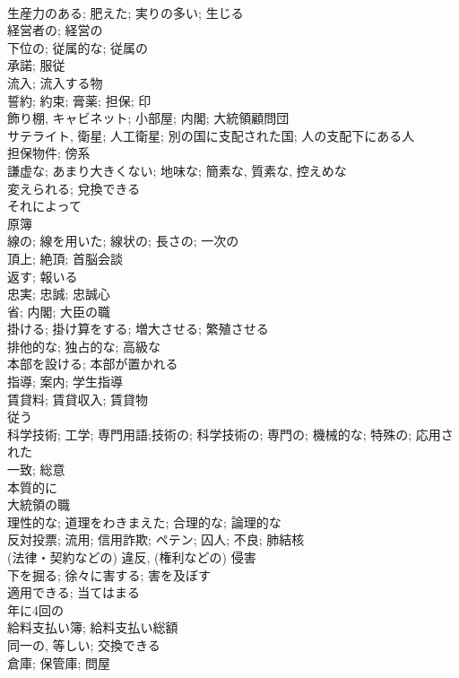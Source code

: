 \documentclass[8pt]{extreport}
\begin{document}
\begin{CJK}{UTF8}{min}
\\	生産力のある; 肥えた; 実りの多い; 生じる	
\\	経営者の; 経営の
\\	下位の; 従属的な; 従属の	
\\	承諾; 服従	
\\	流入; 流入する物	
\\	誓約; 約束; 膏薬; 担保; 印	
\\	飾り棚, キャビネット; 小部屋; 内閣; 大統領顧問団	
\\	サテライト, 衛星; 人工衛星; 別の国に支配された国; 人の支配下にある人	
\\	担保物件; 傍系	
\\	謙虚な; あまり大きくない; 地味な; 簡素な, 質素な, 控えめな	
\\	変えられる; 兌換できる	
\\	それによって	
\\	原簿	
\\	線の; 線を用いた; 線状の; 長さの; 一次の	
\\	頂上; 絶頂; 首脳会談	
\\	返す; 報いる	
\\	忠実; 忠誠; 忠誠心	
\\	省; 内閣; 大臣の職	
\\	掛ける; 掛け算をする; 増大させる; 繁殖させる	
\\	排他的な; 独占的な; 高級な	
\\	本部を設ける; 本部が置かれる	
\\	指導; 案内; 学生指導	
\\	賃貸料; 賃貸収入; 賃貸物	
\\	従う	
\\	科学技術; 工学; 専門用語;技術の; 科学技術の; 専門の; 機械的な; 特殊の; 応用された	
\\	一致; 総意	
\\	本質的に	
\\	大統領の職	
\\	理性的な; 道理をわきまえた; 合理的な; 論理的な	
\\	反対投票; 流用; 信用詐欺; ペテン; 囚人; 不良; 肺結核	
\\	(法律・契約などの) 違反, (権利などの) 侵害	
\\	下を掘る; 徐々に害する; 害を及ぼす	
\\	適用できる; 当てはまる	
\\	年に4回の	
\\	給料支払い簿; 給料支払い総額	
\\	同一の, 等しい; 交換できる	
\\	倉庫; 保管庫; 問屋	

\end{CJK}
\end{document}
